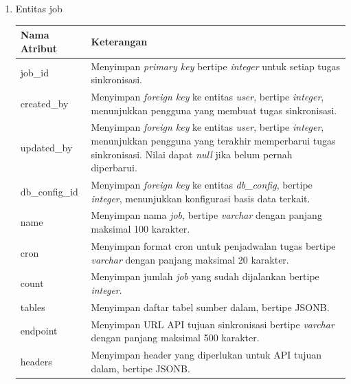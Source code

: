 \begin{enumerate}[label*=\arabic*.,ref=\arabic*]
\begin{enumerate}[label=\arabic*.]
        \item Entitas job
        \vspace{-0.5em}
        \begin{table}[H]
            \centering
            \begin{tabular}{|p{3.25cm}|p{8cm}|}
                \hline
                \rowcolor[HTML]{DAE8FC} 
                {\color[HTML]{000000} Nama Atribut} & {\color[HTML]{000000} Keterangan}           \\ \hline
                job\_id                            & Menyimpan \textit{primary key} bertipe \textit{integer} untuk setiap tugas sinkronisasi. \\ \hline
                created\_by                        & Menyimpan \textit{foreign key} ke entitas \textit{user}, bertipe \textit{integer}, menunjukkan pengguna yang membuat tugas sinkronisasi. \\ \hline
                updated\_by                        & Menyimpan \textit{foreign key} ke entitas \textit{user}, bertipe \textit{integer}, menunjukkan pengguna yang terakhir memperbarui tugas sinkronisasi. Nilai dapat \textit{null} jika belum pernah diperbarui. \\ \hline
                db\_config\_id                     & Menyimpan \textit{foreign key} ke entitas \textit{db\_config}, bertipe \textit{integer}, menunjukkan konfigurasi basis data terkait. \\ \hline
                name                               & Menyimpan nama \textit{job}, bertipe \textit{varchar} dengan panjang maksimal 100 karakter. \\ \hline
                cron                               & Menyimpan format cron untuk penjadwalan tugas bertipe \textit{varchar} dengan panjang maksimal 20 karakter. \\ \hline
                count                               & Menyimpan jumlah \textit{job} yang sudah dijalankan bertipe \textit{integer}. \\ \hline
                tables                             & Menyimpan daftar tabel sumber dalam, bertipe JSONB. \\ \hline
                endpoint                           & Menyimpan URL API tujuan sinkronisasi bertipe \textit{varchar} dengan panjang maksimal 500 karakter. \\ \hline
                headers                            & Menyimpan header yang diperlukan untuk API tujuan dalam, bertipe JSONB. \\ \hline

\end{tabular}
\end{table}
\end{enumerate}
\end{enumerate}
